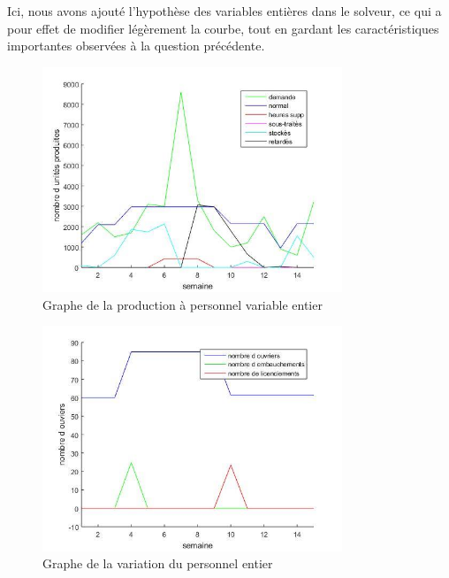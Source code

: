 Ici, nous avons ajouté l'hypothèse des variables entières dans le solveur, ce qui a pour effet de modifier légèrement la courbe, tout en gardant les caractéristiques importantes observées à la question précédente.

\begin{figure}[H]
    \centering
    \includegraphics[width=0.8\textwidth]{graphes/q9_01.jpg}
    \caption{Graphe de la production à personnel variable entier}
    \label{fig:q8_01}
\end{figure}

\begin{figure}[H]
    \centering
    \includegraphics[width=0.8\textwidth]{graphes/q9_02.jpg}
    \caption{Graphe de la variation du personnel entier}
    \label{fig:q8_02}
\end{figure}
